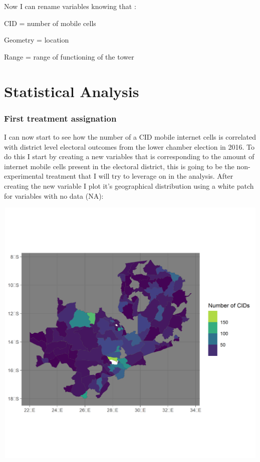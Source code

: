 \documentclass[
]{article}
\begin{document}
Now I can rename variables knowing that :

CID = number of mobile cells

Geometry = location

Range = range of functioning of the tower

\hypertarget{statistical-analysis}{%
\section{Statistical Analysis}\label{statistical-analysis}}

\hypertarget{first-treatment-assignation}{%
\subsubsection{First treatment
assignation}\label{first-treatment-assignation}}

I can now start to see how the number of a CID mobile internet cells is
correlated with district level electoral outcomes from the lower chamber
election in 2016. To do this I start by creating a new variables that is
corresponding to the amount of internet mobile cells present in the
electoral district, this is going to be the non-experimental treatment
that I will try to leverage on in the analysis. After creating the new
variable I plot it's geographical distribution using a white patch for
variables with no data (NA):

\includegraphics[width=6.25in,height=5.20833in]{treat1.png}
\end{document}
